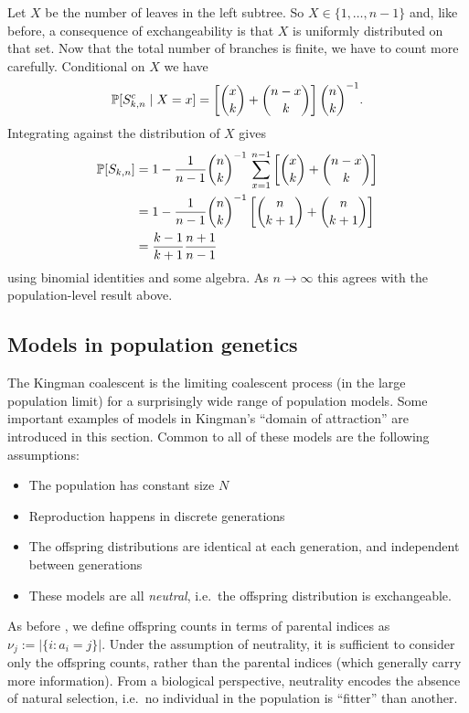 Let $X$ be the number of leaves in the left subtree. So $X \in \{1,\dots,n-1\} $ and, like before, a consequence of exchangeability is that $X$ is uniformly distributed on that set.
Now that the total number of branches is finite, we have to count more carefully. Conditional on $X$ we have
\begin{equation*}
\mathbb{P} [S_{k,n}^c \mid X=x]
= \left[ \binom{x}{k} + \binom{n-x}{k} \right] \binom{n}{k}^{-1} .
\end{equation*}
Integrating against the distribution of $X$ gives
\begin{align*}
\mathbb{P}[ S_{k,n} ]
&= 1 - \frac{1}{n-1} \binom{n}{k}^{-1} \, \sum_{x=1}^{n-1} 
        \left[ \binom{x}{k} + \binom{n-x}{k} \right] \\
&= 1 - \frac{1}{n-1} \binom{n}{k}^{-1} 
        \left[ \binom{n}{k+1} + \binom{n}{k+1} \right] \\
&= \frac{k-1}{k+1} \frac{n+1}{n-1}
\end{align*}
using binomial identities and some algebra.
As $n\to\infty$ this agrees with the population-level result above.



\subsection{Models in population genetics}\label{sec:popgenmodels}
The Kingman coalescent is the limiting coalescent process (in the large population limit) for a surprisingly wide range of population models. Some important examples of models in Kingman's ``domain of attraction'' are introduced in this section.
Common to all of these models are the following assumptions:
\begin{itemize}
\item The population has constant size $N$
\item Reproduction happens in discrete generations
\item The offspring distributions are identical at each generation, and independent between generations
\item These models are all \emph{neutral}, i.e.\ the offspring distribution is exchangeable.
\end{itemize}
As before , we define offspring counts in terms of parental indices as $\nu_j := |\{ i: a_i = j\}|$.
Under the assumption of neutrality, it is sufficient to consider only the offspring counts, rather than the parental indices (which generally carry more information).
From a biological perspective, neutrality encodes the absence of natural selection, i.e.\ no individual in the population is ``fitter'' than another.

